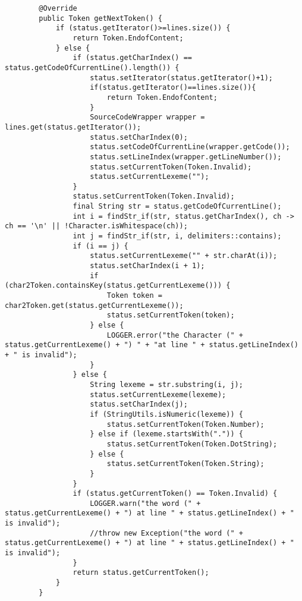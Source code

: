 \documentclass[12pt]{extarticle}
\begin{document}
\begin{enumerate}
\begin{lstlisting}
        @Override
        public Token getNextToken() {
            if (status.getIterator()>=lines.size()) {
                return Token.EndofContent;
            } else {
                if (status.getCharIndex() == status.getCodeOfCurrentLine().length()) {
                    status.setIterator(status.getIterator()+1);
                    if(status.getIterator()==lines.size()){
                        return Token.EndofContent;
                    }
                    SourceCodeWrapper wrapper = lines.get(status.getIterator());
                    status.setCharIndex(0);
                    status.setCodeOfCurrentLine(wrapper.getCode());
                    status.setLineIndex(wrapper.getLineNumber());
                    status.setCurrentToken(Token.Invalid);
                    status.setCurrentLexeme("");
                }
                status.setCurrentToken(Token.Invalid);
                final String str = status.getCodeOfCurrentLine();
                int i = findStr_if(str, status.getCharIndex(), ch -> ch == '\n' || !Character.isWhitespace(ch));
                int j = findStr_if(str, i, delimiters::contains);
                if (i == j) {
                    status.setCurrentLexeme("" + str.charAt(i));
                    status.setCharIndex(i + 1);
                    if (char2Token.containsKey(status.getCurrentLexeme())) {
                        Token token = char2Token.get(status.getCurrentLexeme());
                        status.setCurrentToken(token);
                    } else {
                        LOGGER.error("the Character (" + status.getCurrentLexeme() + ") " + "at line " + status.getLineIndex() + " is invalid");
                    }
                } else {
                    String lexeme = str.substring(i, j);
                    status.setCurrentLexeme(lexeme);
                    status.setCharIndex(j);
                    if (StringUtils.isNumeric(lexeme)) {
                        status.setCurrentToken(Token.Number);
                    } else if (lexeme.startsWith(".")) {
                        status.setCurrentToken(Token.DotString);
                    } else {
                        status.setCurrentToken(Token.String);
                    }
                }
                if (status.getCurrentToken() == Token.Invalid) {
                    LOGGER.warn("the word (" + status.getCurrentLexeme() + ") at line " + status.getLineIndex() + " is invalid");
                    //throw new Exception("the word (" + status.getCurrentLexeme() + ") at line " + status.getLineIndex() + " is invalid");
                }
                return status.getCurrentToken();
            }
        }
    

\end{lstlisting}
\end{enumerate}
\end{document}
